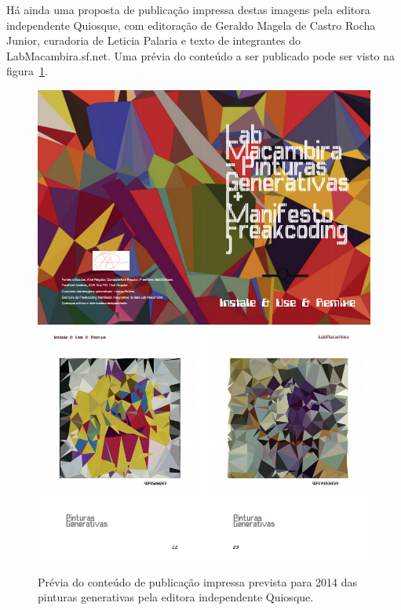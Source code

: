 Há ainda uma proposta de publicação impressa destas imagens pela
editora independente Quiosque, com editoração de Geraldo Magela de
Castro Rocha Junior, curadoria de Leticia Palaria e texto de
integrantes do LabMacambira.sf.net. Uma prévia do conteúdo a ser
publicado pode ser visto na figura~\ref{fig:quiosque}.

\begin{figure}[htb]
  \begin{center}
    \caption{Prévia do conteúdo de publicação impressa prevista para
      2014 das pinturas generativas pela editora independente
      Quiosque.}
  \label{fig:quiosque}
    \includegraphics[width=\textwidth]{figs/quiosque1}
    \includegraphics[width=\textwidth]{figs/quiosque2}
   \fonteminha
  \end{center}
\end{figure}
